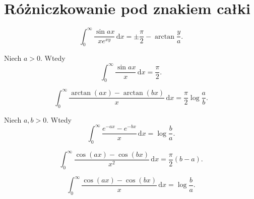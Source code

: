 %

\section{Różniczkowanie pod znakiem całki}

\begin{integral}
    \begin{equation}
        \int_0^\infty \frac{\sin ax}{x e^{xy}} \,\mathrm{d}x = \pm \frac \pi 2 - \arctan \frac y a.
    \end{equation}
\end{integral}

\begin{integral}
    Niech $a > 0$.
    Wtedy
    \begin{equation}
        \int_0^\infty \frac{\sin ax}{x} \,\mathrm{d}x = \frac \pi 2.
    \end{equation}
\end{integral}

\begin{integral}
    \begin{equation}
        \int_0^\infty \frac{\arctan (ax) - \arctan (bx)}{x} \,\mathrm{d}x = \frac \pi 2 \log \frac a b.
    \end{equation}
\end{integral}

\begin{integral}
    Niech $a, b > 0$.
    Wtedy
    \begin{equation}
        \int_0^\infty \frac{e^{-ax} - e^{-bx}}{x} \,\mathrm{d}x = \log \frac b a.
    \end{equation}
\end{integral}

\begin{integral}
    \begin{equation}
        \int_0^\infty \frac{\cos (ax) - \cos (bx)}{x^2} \,\mathrm{d}x = \frac \pi 2 (b - a).
    \end{equation}
\end{integral}

\begin{integral}
    \begin{equation}
        \int_0^\infty \frac{\cos (ax) - \cos (bx)}{x} \,\mathrm{d}x = \log \frac b a.
    \end{equation}
\end{integral}

